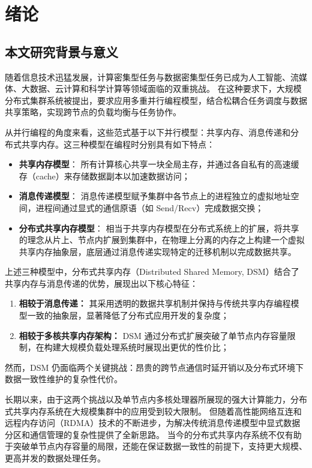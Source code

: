 \chapter{绪论}\label{chap:introduction}{
  \section{本文研究背景与意义}
  随着信息技术迅猛发展，计算密集型任务与数据密集型任务已成为人工智能、流媒体、大数据、云计算和科学计算等领域面临的双重挑战。
  在这种要求下，大规模分布式集群系统被提出，要求应用多重并行编程模型，结合松耦合任务调度与数据共享策略，实现跨节点的负载均衡与任务协作。

  从并行编程的角度来看，这些范式基于以下并行模型：共享内存、消息传递和分
  布式共享内存。这三种模型在编程时分别具有如下特点：
  \begin{itemize}
    \item \textbf{共享内存模型}： 所有计算核心共享一块全局主存，并通过各自私有的高速缓存（cache）来存储数据副本以加速数据访问；
    \item \textbf{消息传递模型}： 消息传递模型赋予集群中各节点上的进程独立的虚拟地址空间，进程间通过显式的通信原语（如 Send/Recv）完成数据交换；
    \item \textbf{分布式共享内存模型}： 相当于共享内存模型在分布式系统上的扩展，将共享的理念从片上、节点内扩展到集群中，在物理上分离的内存之上构建一个虚拟共享内存抽象层，底层通过消息传递实现特定的迁移机制以完成数据共享。
  \end{itemize}

  上述三种模型中，分布式共享内存（Distributed Shared Memory, DSM）结合了共享内存与消息传递的优势，展现出以下核心特征：
  \begin{enumerate}[leftmargin=1em, align=left]
    \item \textbf{相较于消息传递：} 其采用透明的数据共享机制并保持与传统共享内存编程模型一致的抽象层，显著降低了分布式应用开发的复杂度；
    \item \textbf{相较于多核共享内存架构：} DSM 通过分布式扩展突破了单节点内存容量限制，在构建大规模负载处理系统时展现出更优的性价比；
  \end{enumerate}

  然而，DSM 仍面临两个关键挑战：昂贵的跨节点通信时延开销以及分布式环境下数据一致性维护的复杂性代价。

  长期以来，由于这两个挑战以及单节点内多核处理器所展现的强大计算能力，分布式共享内存系统在大规模集群中的应用受到较大限制。
  但随着高性能网络互连和远程内存访问（RDMA）技术的不断进步，为解决传统消息传递模型中显式数据分区和通信管理的复杂性提供了全新思路。
  当今的分布式共享内存系统不仅有助于突破单节点内存容量的局限，还能在保证数据一致性的前提下，支持更大规模、更高并发的数据处理任务。

}

